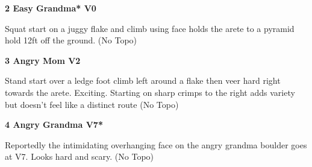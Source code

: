 \begin{multicols}{2}
					\label{rt:Easy Grandma}
\colorbox{green!20}{
\parbox{0.95\linewidth}{
\textbf{
2 Easy Grandma* V0   
}
}
}

					\begin{adjustwidth}{0.5cm}{}				
					Squat start on a juggy flake and climb using face holds the arete to a pyramid hold 12ft off the ground.
						\newline (No Topo) 
					\end{adjustwidth}
					\label{rt:Angry Mom}
\colorbox{green!20}{
\parbox{0.95\linewidth}{
\textbf{
3 Angry Mom V2    \warn 
}
}
}

					\begin{adjustwidth}{0.5cm}{}				
					Stand start over a ledge foot climb left around a flake then veer hard right towards the arete. Exciting. Starting on sharp crimps to the right adds variety but doesn't feel like a distinct route
						\newline (No Topo) 
					\end{adjustwidth}
					\label{rt:Angry Grandma}
\colorbox{Goldenrod!50}{
\parbox{0.95\linewidth}{
\textbf{
4 Angry Grandma V7*  
}
}
}

					\begin{adjustwidth}{0.5cm}{}				
					Reportedly the intimidating overhanging face on the angry grandma boulder goes at V7. Looks hard and scary.
						\newline (No Topo) 
					\end{adjustwidth}
\end{multicols}
\clearpage